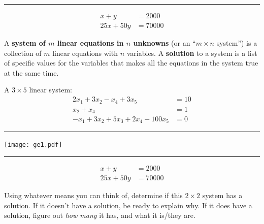 \documentclass[
  letterpaper,
  DIV=11,
  numbers=noendperiod]{scrartcl}
\begin{document}
\begin{center}\rule{0.5\linewidth}{0.5pt}\end{center}

\[\begin{align*}
x + y &= 2000 \\
25x + 50y &= 70000
\end{align*}\]

\begin{tcolorbox}[enhanced jigsaw, coltitle=black, breakable, bottomrule=.15mm, opacitybacktitle=0.6, left=2mm, opacityback=0, rightrule=.15mm, title=\textcolor{quarto-callout-note-color}{\faInfo}\hspace{0.5em}{System of equations}, leftrule=.75mm, toptitle=1mm, colframe=quarto-callout-note-color-frame, toprule=.15mm, colbacktitle=quarto-callout-note-color!10!white, bottomtitle=1mm, titlerule=0mm, arc=.35mm, colback=white]

A \textbf{system of \(m\) linear equations in \(n\) unknowns} (or an
``\(m \times n\) system'') is a collection of \(m\) linear equations
with \(n\) variables. A \textbf{solution} to a system is a list of
specific values for the variables that makes all the equations in the
system true at the same time.

\end{tcolorbox}

A \(3 \times 5\) linear system: \[\begin{align*}
2x_1 + 3x_2 - x_4 + 3x_5 &= 10 \\
x_2 + x_4 &= 1 \\
-x_1 + 3x_2 + 5x_3 + 2x_4 - 100x_5 &= 0 
\end{align*}\]

\begin{center}\rule{0.5\linewidth}{0.5pt}\end{center}

\texttt{[image: ge1.pdf]}

\begin{center}\rule{0.5\linewidth}{0.5pt}\end{center}

\[\begin{align*}
x + y &= 2000 \\
25x + 50y &= 70000
\end{align*}\]

\begin{tcolorbox}[enhanced jigsaw, coltitle=black, breakable, bottomrule=.15mm, opacitybacktitle=0.6, left=2mm, opacityback=0, rightrule=.15mm, title=\textcolor{quarto-callout-important-color}{\faExclamation}\hspace{0.5em}{Activity}, leftrule=.75mm, toptitle=1mm, colframe=quarto-callout-important-color-frame, toprule=.15mm, colbacktitle=quarto-callout-important-color!10!white, bottomtitle=1mm, titlerule=0mm, arc=.35mm, colback=white]

Using whatever means you can think of, determine if this \(2 \times 2\)
system has a solution. If it doesn't have a solution, be ready to
explain why. If it does have a solution, figure out \emph{how many} it
has, and what it is/they are.

\end{tcolorbox}
\end{document}
